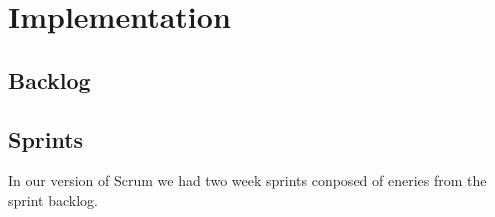 \section{Implementation}
\thispagestyle{plain}


\subsection{Backlog}




\subsection{Sprints}

In our version of Scrum we had two week sprints conposed of eneries from the sprint backlog. 







